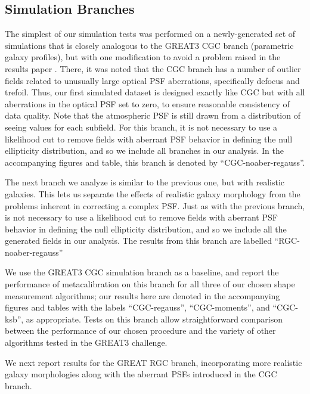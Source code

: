 \documentclass[iop]{emulateapj}
\begin{document}
\subsection{Simulation Branches}


The simplest of our simulation tests was performed on a
newly-generated set of simulations that is closely analogous to the
GREAT3 CGC branch (parametric galaxy profiles), but with one
modification to avoid a problem raised in the results paper
\citep{2015MNRAS.450.2963M}.  There, it was noted that the CGC branch
has a number of outlier fields related to unusually large optical PSF
aberrations, specifically defocus and trefoil.  Thus, our first
simulated dataset is designed exactly like CGC but with all
aberrations in the optical PSF set to zero, to ensure reasonable
consistency of data quality.  Note that the atmospheric PSF is still
drawn from a distribution of seeing values for each subfield. For this
branch, it is not necessary to use a likelihood cut to remove fields
with aberrant PSF behavior in defining the null ellipticity
distribution, and so we include all branches in our analysis. In the
accompanying figures and table, this branch is denoted by
``CGC-noaber-regauss''.

The next branch we analyze is similar to the previous one, but with
realistic galaxies. This lets us separate the effects of realistic
galaxy morphology from the problems inherent in correcting a complex
PSF. Just as with the previous branch, is not necessary to use a
likelihood cut to remove fields with aberrant PSF behavior in defining
the null ellipticity distribution, and so we include all the generated
fields in our analysis. The results from this branch are labelled
``RGC-noaber-regauss''

We use the GREAT3 CGC simulation branch as a baseline, and report the
performance of metacalibration on this branch for all three of our
chosen shape measurement algorithms; our results here are denoted in
the accompanying figures and tables with the labels ``CGC-regauss'',
``CGC-moments'', and ``CGC-ksb'', as appropriate.  Tests on this branch allow
straightforward comparison between the performance of our chosen
procedure and the variety of other algorithms tested in the GREAT3
challenge.

We next report results for the GREAT RGC branch, incorporating more
realistic galaxy morphologies along with the aberrant PSFs introduced
in the CGC branch.
\end{document}
